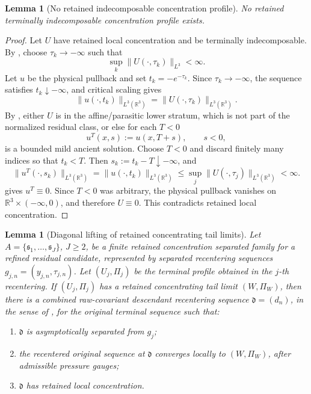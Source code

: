 \documentclass[11pt]{amsart}
\numberwithin{equation}{section}
\theoremstyle{plain}
\newtheorem{lemma}[theorem]{Lemma}
\theoremstyle{definition}
\theoremstyle{remark}
\newcommand{\R}{\mathbb R}
\begin{document}
\begin{lemma}[No retained indecomposable concentration profile]
\label{lem:no-atomic-active}
No retained terminally indecomposable concentration profile exists.
\end{lemma}

\begin{proof}
Let \(U\) have retained local concentration and be terminally indecomposable.  By
, choose \(\tau_k\to-\infty\) such that
\[
   \sup_k\|U(\cdot,\tau_k)\|_{L^3}<\infty .
\]
Let \(u\) be the physical pullback and set \(t_k=-e^{-\tau_k}\).  Since
\(\tau_k\to-\infty\), the sequence satisfies \(t_k\downarrow-\infty\), and
critical scaling gives
\[
   \|u(\cdot,t_k)\|_{L^3(\R^3)}
   =
   \|U(\cdot,\tau_k)\|_{L^3(\R^3)}.
\]
By , either \(U\) is in the affine/parasitic
lower stratum, which is not part of the normalized residual class, or else for
each \(T<0\)
\[
   u^T(x,s):=u(x,T+s),\qquad s<0,
\]
is a bounded mild ancient solution.  Choose \(T<0\) and discard finitely many
indices so that \(t_k<T\).  Then \(s_k:=t_k-T\downarrow-\infty\), and
\[
   \|u^T(\cdot,s_k)\|_{L^3(\R^3)}
   =
   \|u(\cdot,t_k)\|_{L^3(\R^3)}
   \le \sup_j\|U(\cdot,\tau_j)\|_{L^3(\R^3)}<\infty .
   \]
 gives \(u^T\equiv0\).  Since \(T<0\) was arbitrary, the
physical pullback vanishes on \(\mathbb R^3\times(-\infty,0)\), and therefore
\(U\equiv0\).  This contradicts retained local concentration.
\end{proof}

\begin{lemma}[Diagonal lifting of retained concentrating tail limits]
\label{lem:diagonal-lifting-descendants}
Let \(A=\{\mathfrak s_1,\dots,\mathfrak s_J\}\), \(J\ge2\), be a finite
retained concentration separated family for a refined residual candidate, represented by
separated recentering sequences \(g_{j,n}=(y_{j,n},\tau_{j,n})\).  Let
\((U_j,\Pi_j)\) be the terminal profile obtained in the \(j\)-th recentering.  If
\((U_j,\Pi_j)\) has a retained concentrating tail limit \((W,\Pi_W)\), then
there is a combined raw-covariant descendant recentering sequence
\(\mathfrak d=(d_n)\), in the sense of
, for the original terminal
sequence such that:
\begin{enumerate}[label=(\roman*)]
   \item \(\mathfrak d\) is asymptotically separated from \(g_j\);
   \item the recentered original sequence at \(\mathfrak d\) converges locally
   to \((W,\Pi_W)\), after admissible pressure gauges;
   \item \(\mathfrak d\) has retained local concentration.
\end{enumerate}
\end{lemma}
\end{document}
